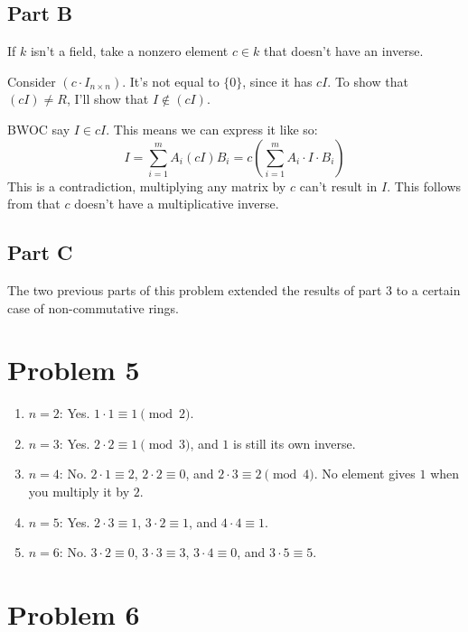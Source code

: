 \documentclass[12pt]{article}
\begin{document}
\pagebreak

\subsection{Part B}

If $k$ isn't a field, take a nonzero element $c \in k$ that doesn't have an inverse.

Consider $\left(c \cdot I_{n \times n}\right)$.
It's not equal to $\{0\}$, since it has $cI$.
To show that $(cI) \ne R$, I'll show that $I \notin (cI)$.

BWOC say $I \in cI$.
This means we can express it like so:
\[I=\sum_{i=1}^{m} A_i(cI)B_i=c\left(\sum_{i=1}^{m} A_i \cdot I \cdot B_i\right)\]
This is a contradiction, multiplying any matrix by $c$ can't result in $I$.
This follows from that $c$ doesn't have a multiplicative inverse.

\subsection{Part C}

The two previous parts of this problem extended the results of part 3
to a certain case of non-commutative rings.

\section{Problem 5}

\begin{enumerate}
    \item $n=2$: Yes. $1 \cdot 1 \equiv 1\pmod 2$.

    \item $n=3$: Yes. $2 \cdot 2\equiv 1\pmod 3$, and $1$ is still its own inverse.

    \item $n=4$: No. $2 \cdot 1 \equiv 2$, $2 \cdot 2 \equiv 0$, and $2 \cdot 3\equiv 2\pmod 4$.
            No element gives $1$ when you multiply it by $2$.

    \item $n=5$: Yes. $2 \cdot 3\equiv 1$, $3 \cdot 2 \equiv 1$, and $4 \cdot 4 \equiv 1$.

    \item $n=6$: No. $3 \cdot 2 \equiv 0$, $3 \cdot 3 \equiv 3$, $3 \cdot 4 \equiv 0$, and $3 \cdot 5 \equiv 5$.
\end{enumerate}

\section{Problem 6}
\end{document}
